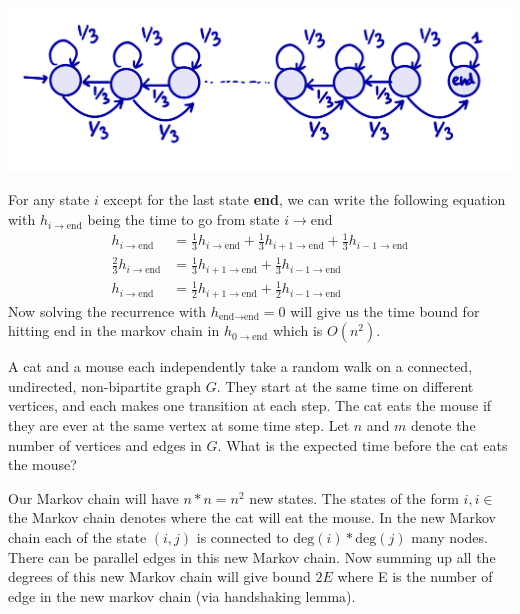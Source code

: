 \documentclass[addpoints,12pt]{exam}
\begin{document}
\begin{questions}
\begin{parts}
\begin{solution}
                \includegraphics[scale=0.12]{chain}

                For any state $i$ except for the last state \textbf{end}, we can write the following equation with $h_{i \to \text{end}}$ being the time to go from state $i \to \text{end}$
                \begin{align*}
                    h_{i \to \text{end}} &= \frac{1}{3} h_{i \to \text{end}} + \frac{1}{3} h_{i+1 \to \text{end}} + \frac{1}{3} h_{i-1 \to \text{end}}\\
                    \frac{2}{3} h_{i \to \text{end}} &= \frac{1}{3} h_{i+1 \to \text{end}} + \frac{1}{3} h_{i-1 \to \text{end}}\\
                    h_{i \to \text{end}} &= \frac{1}{2} h_{i+1 \to \text{end}} + \frac{1}{2} h_{i-1 \to \text{end}}
                \end{align*}
                Now solving the recurrence with $h_{\text{end} \to \text{end}} = 0$ will give us the time bound for hitting end in the markov chain in $h_{0 \to \text{end}}$ which is $O(n^2)$.
            \end{solution}
		\end{parts}
		
		\question[5] A cat and a mouse each independently take a random walk on a connected, undirected, non-bipartite graph $G$. They start at the same time on different vertices, and each makes one transition at each step. The cat eats the mouse if they are ever at the same vertex at some time step. Let $n$ and $m$ denote the number of vertices and edges in $G$. What is the expected time before the cat eats the mouse?
		
		\begin{solution}
			Our Markov chain will have $n*n = n^2$ new states. The states of the form $i, i \in$ the Markov chain denotes where the cat will eat the mouse. In the new Markov chain each of the state $(i, j)$ is connected to $\mathrm{deg}(i) * \mathrm{deg}(j)$ many nodes. There can be parallel edges in this new Markov chain. Now summing up all the degrees of this new Markov chain will give bound $2E$ where E is the number of edge in the new markov chain (via handshaking lemma).
            

\end{solution}
\end{questions}
\end{document}

